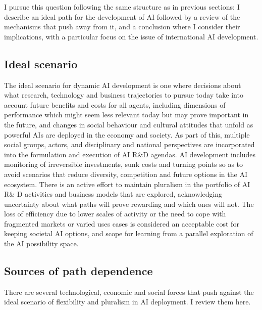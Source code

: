 \documentclass[11pt]{article}
\begin{document}
I pursue this question following the same structure as in previous sections: I describe an ideal path for the development of AI followed by a review of the mechanisms that push away from it, and a conclusion where I consider their implications, with a particular focus on the issue of international AI development.

\subsection{Ideal scenario}
\label{subsec:ideal_pd}
The ideal scenario for dynamic AI development is one where decisions about what research, technology and business trajectories to pursue today take into account future benefits and costs for all agents, including dimensions of performance which might seem less relevant today but may prove important in the future, and changes in social behaviour and cultural attitudes that unfold as powerful AIs are deployed in the economy and society. As part of this, multiple social groups, actors, and disciplinary and national perspectives are incorporated into the formulation and execution of AI R\&D agendas.  AI development includes monitoring of irreversible investments, sunk costs and turning points so as to avoid scenarios that reduce diversity, competition and future options in the AI ecosystem. There is an active effort to maintain pluralism in the portfolio of AI R\& D activities and business models that are explored, acknowledging uncertainty about what paths will prove rewarding and which ones will not. The loss of efficiency due to lower scales of activity or the need to cope with fragmented markets or varied uses cases is considered an acceptable cost for keeping societal AI options, and scope for learning from a parallel exploration of the AI possibility space. 

\subsection{Sources of path dependence}
\label{subsec:non_ideal_pd}
There are several technological, economic and social forces that push against the ideal scenario of flexibility and pluralism in AI deployment. I review them here.
\end{document}
